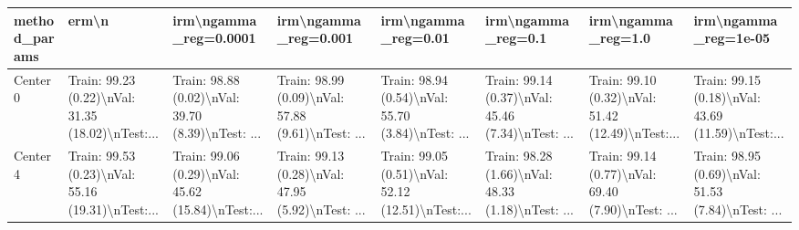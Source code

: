 \begin{tabular}{llllllll}
\toprule
method\_params &                                              erm\textbackslash n &                              irm\textbackslash ngamma\_reg=0.0001 &                               irm\textbackslash ngamma\_reg=0.001 &                                irm\textbackslash ngamma\_reg=0.01 &                                 irm\textbackslash ngamma\_reg=0.1 &                                 irm\textbackslash ngamma\_reg=1.0 &                               irm\textbackslash ngamma\_reg=1e-05 \\
\midrule
Center 0 &  Train: 99.23 (0.22)\textbackslash nVal: 31.35 (18.02)\textbackslash nTest:... &  Train: 98.88 (0.02)\textbackslash nVal: 39.70 (8.39)\textbackslash nTest: ... &  Train: 98.99 (0.09)\textbackslash nVal: 57.88 (9.61)\textbackslash nTest: ... &  Train: 98.94 (0.54)\textbackslash nVal: 55.70 (3.84)\textbackslash nTest: ... &  Train: 99.14 (0.37)\textbackslash nVal: 45.46 (7.34)\textbackslash nTest: ... &  Train: 99.10 (0.32)\textbackslash nVal: 51.42 (12.49)\textbackslash nTest:... &  Train: 99.15 (0.18)\textbackslash nVal: 43.69 (11.59)\textbackslash nTest:... \\
Center 4 &  Train: 99.53 (0.23)\textbackslash nVal: 55.16 (19.31)\textbackslash nTest:... &  Train: 99.06 (0.29)\textbackslash nVal: 45.62 (15.84)\textbackslash nTest:... &  Train: 99.13 (0.28)\textbackslash nVal: 47.95 (5.92)\textbackslash nTest: ... &  Train: 99.05 (0.51)\textbackslash nVal: 52.12 (12.51)\textbackslash nTest:... &  Train: 98.28 (1.66)\textbackslash nVal: 48.33 (1.18)\textbackslash nTest: ... &  Train: 99.14 (0.77)\textbackslash nVal: 69.40 (7.90)\textbackslash nTest: ... &  Train: 98.95 (0.69)\textbackslash nVal: 51.53 (7.84)\textbackslash nTest: ... \\
\bottomrule
\end{tabular}
